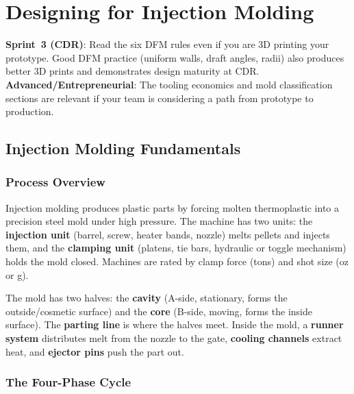 \chapter{Designing for Injection Molding}\label{ch:molding}

\begin{tipbox}
\textbf{Sprint~3 (CDR)}: Read the six DFM rules even if you are 3D printing your prototype. Good DFM practice (uniform walls, draft angles, radii) also produces better 3D prints and demonstrates design maturity at CDR. \textbf{Advanced/Entrepreneurial}: The tooling economics and mold classification sections are relevant if your team is considering a path from prototype to production.
\end{tipbox}


\vspace{1em}




\vspace{1em}


\section{Injection Molding Fundamentals}

\subsection{Process Overview}

Injection molding produces plastic parts by forcing molten thermoplastic into a precision steel mold under high pressure. The machine has two units: the \textbf{injection unit} (barrel, screw, heater bands, nozzle) melts pellets and injects them, and the \textbf{clamping unit} (platens, tie bars, hydraulic or toggle mechanism) holds the mold closed. Machines are rated by clamp force (tons) and shot size (oz or g).

The mold has two halves: the \textbf{cavity} (A-side, stationary, forms the outside/cosmetic surface) and the \textbf{core} (B-side, moving, forms the inside surface). The \textbf{parting line} is where the halves meet. Inside the mold, a \textbf{runner system} distributes melt from the nozzle to the gate, \textbf{cooling channels} extract heat, and \textbf{ejector pins} push the part out.

\subsection{The Four-Phase Cycle}

